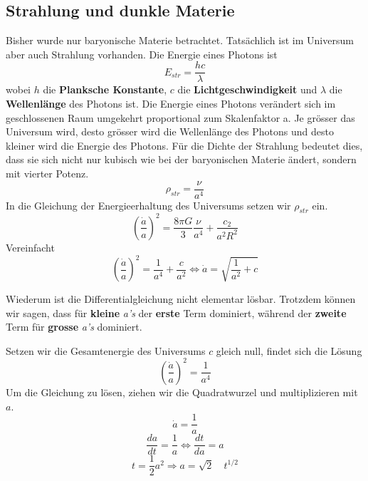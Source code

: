 \begin{refsection}
\subsection{Strahlung und dunkle Materie}
Bisher wurde nur baryonische Materie betrachtet. Tatsächlich ist im Universum aber auch Strahlung vorhanden. Die Energie eines Photons ist 
\begin{equation}
E_{str} = \frac{h c}{\lambda}
\end{equation}
wobei $h$ die \textbf{Planksche Konstante}, $c$ die \textbf{Lichtgeschwindigkeit} und $\lambda$ die \textbf{Wellenlänge} des Photons ist.
Die Energie eines Photons verändert sich im geschlossenen Raum umgekehrt proportional zum Skalenfaktor a. Je grösser das Universum wird, desto grösser wird die Wellenlänge des Photons und desto kleiner wird die Energie des Photons. Für die Dichte der Strahlung bedeutet dies, dass sie sich nicht nur kubisch wie bei der baryonischen Materie ändert, sondern mit vierter Potenz.
\begin{equation}
\rho_{str} = \frac{\nu}{a^4}
\end{equation}
In die Gleichung der Energieerhaltung des Universums setzen wir $\rho_{str}$ ein.
\[
\left(\frac{\dot{a}}{a} \right)^2 = \frac{8 \pi G}{3} \frac{\nu}{a^4} + \frac{c_2}{a^2 R^2}
\]
Vereinfacht
\[
\left(\frac{\dot{a}}{a} \right)^2 = \frac{1}{a^4} + \frac{c}{a^2} \Leftrightarrow \dot{a} = \sqrt{\frac{1}{a^2} + c}
\]

Wiederum ist die Differentialgleichung nicht elementar lösbar. Trotzdem können wir sagen, dass für \textbf{kleine} \textit{a's} der \textbf{erste} Term dominiert, während der \textbf{zweite} Term für \textbf{grosse} \textit{a's} dominiert.

Setzen wir die Gesamtenergie des Universums $c$ gleich null, findet sich die Lösung	\[\left(\frac{\dot{a}}{a} \right)^2 = \frac{1}{a^4}\]
Um die Gleichung zu lösen, ziehen wir die Quadratwurzel und multiplizieren mit $a$.
\[ \dot{a} = \frac{1}{a} \]
\[\frac{da}{dt} =\frac{1}{a} \Leftrightarrow \frac{dt}{da} = a \]
\[ t = \frac{1}{2} a^{2} \Rightarrow a = \sqrt{2} \quad t^{1/2} \]

\end{refsection}
